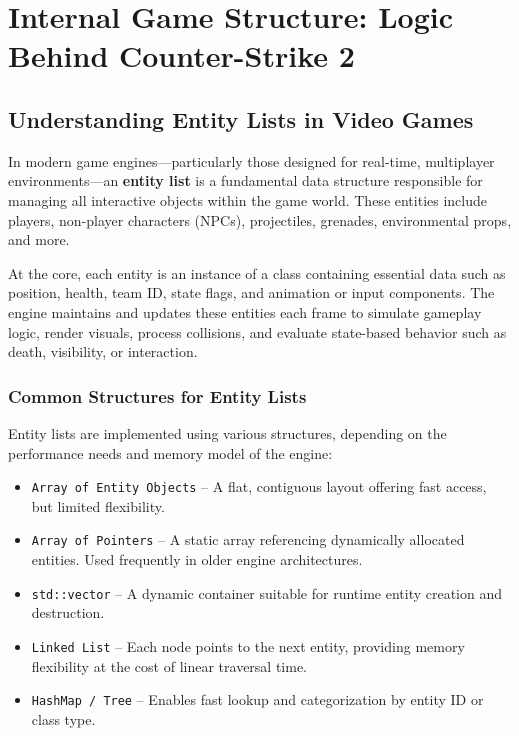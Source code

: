 \chapter{Internal Game Structure: Logic Behind Counter-Strike 2}

\section{Understanding Entity Lists in Video Games}

In modern game engines—particularly those designed for real-time, multiplayer environments—an \textbf{entity list} is a fundamental data structure responsible for managing all interactive objects within the game world. These entities include players, non-player characters (NPCs), projectiles, grenades, environmental props, and more.

At the core, each entity is an instance of a class containing essential data such as position, health, team ID, state flags, and animation or input components. The engine maintains and updates these entities each frame to simulate gameplay logic, render visuals, process collisions, and evaluate state-based behavior such as death, visibility, or interaction.

\subsection{Common Structures for Entity Lists}

Entity lists are implemented using various structures, depending on the performance needs and memory model of the engine:

\begin{itemize}
    \item \texttt{Array of Entity Objects} – A flat, contiguous layout offering fast access, but limited flexibility.
    \item \texttt{Array of Pointers} – A static array referencing dynamically allocated entities. Used frequently in older engine architectures.
    \item \texttt{std::vector} – A dynamic container suitable for runtime entity creation and destruction.
    \item \texttt{Linked List} – Each node points to the next entity, providing memory flexibility at the cost of linear traversal time.
    \item \texttt{HashMap / Tree} – Enables fast lookup and categorization by entity ID or class type.
\end{itemize}

